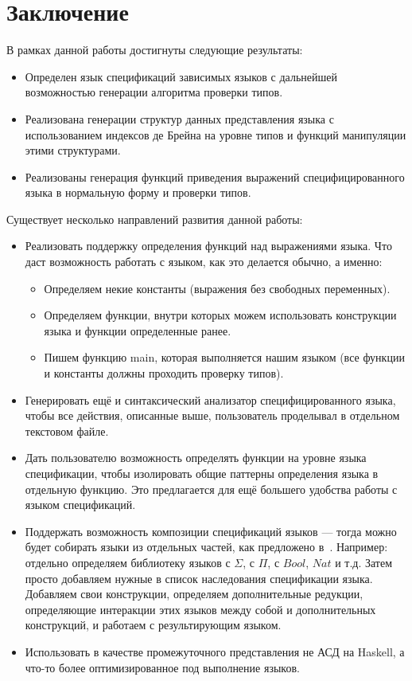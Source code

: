 \documentclass{spbau-diploma}
\begin{document}





\section*{Заключение}

В рамках данной работы достигнуты следующие результаты:
\begin{itemize}
  \item Определен язык спецификаций зависимых языков с дальнейшей возможностью генерации алгоритма проверки типов.
  \item Реализована генерации структур данных представления языка с использованием индексов де Брейна на уровне типов и функций манипуляции этими структурами.
  \item Реализованы генерация функций приведения выражений специфицированного языка в нормальную форму и проверки типов.
\end{itemize}

Существует несколько направлений развития данной работы:
\begin{itemize}
  \item Реализовать поддержку определения функций над выражениями языка. Что даст возможность работать с языком, как это делается обычно, а именно:
  \begin{itemize}
    \item Определяем некие константы (выражения без свободных переменных).
    \item Определяем функции, внутри которых можем использовать конструкции языка и функции определенные ранее.
    \item Пишем функцию main, которая выполняется нашим языком (все функции и константы должны проходить проверку типов).
  \end{itemize}
  \item Генерировать ещё и синтаксический анализатор специфицированного языка, чтобы все действия, описанные выше, пользователь проделывал в отдельном текстовом файле.
  \item Дать пользователю возможность определять функции на уровне языка спецификации, чтобы изолировать общие паттерны определения языка в отдельную функцию. Это предлагается для ещё большего удобства работы с языком спецификаций.
  \item Поддержать возможность композиции спецификаций языков --- тогда можно будет собирать языки из отдельных частей, как предложено в~\cite{isaev}. Например: отдельно определяем библиотеку языков с $\Sigma$, с $\Pi$, с $Bool$, $Nat$ и т.д. Затем просто добавляем нужные в список наследования спецификации языка. Добавляем свои конструкции, определяем дополнительные редукции, определяющие интеракции этих языков между собой и дополнительных конструкций, и работаем с результирующим языком.
  \item Использовать в качестве промежуточного представления\cite{IR} не АСД на Haskell, а что-то более оптимизированное под выполнение языков.
\end{itemize}






\end{document}
